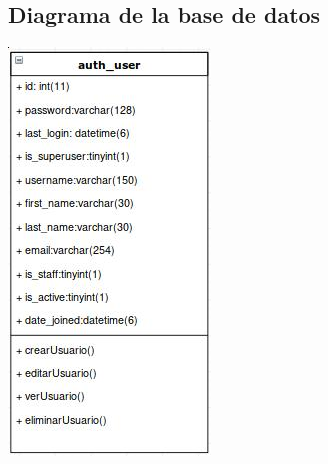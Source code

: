 \documentclass[9pt]{article}
\begin{document}
\subsection*{Diagrama de la base de datos}
\includegraphics[width=\textwidth]{db}
\end{document}
